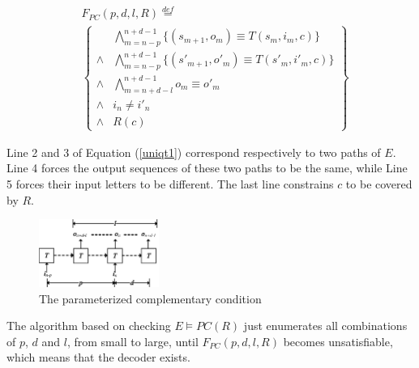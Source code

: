 \documentclass[journal]{IEEEtran}
\begin{document}
\begin{equation}\label{uniqt1}
\begin{split}
&F_{PC}(p,d,l,R)\stackrel{def}{=}\\
&\left\{
\begin{array}{cc}
&\bigwedge_{m=n-p}^{n+d-1}
\{
(s_{m+1},o_m)\equiv T(s_m,i_m,c)
\}
\\
\wedge&\bigwedge_{m=n-p}^{n+d-1}
\{
(s'_{m+1},o'_m)\equiv T(s'_m,i'_m,c)
\}
\\
\wedge&\bigwedge_{m=n+d-l}^{n+d-1}o_m\equiv o'_m \\
\wedge& i_n\ne i'_n \\
\wedge& R(c)
\end{array}
\right\}
\end{split}
\end{equation}


Line 2 and 3 of Equation (\ref{uniqt1}) correspond respectively to two paths of $E$.
Line 4 forces the output sequences of these two paths to be the same,
while Line 5 forces their input letters to be different.
The last line constrains $c$ to be covered by $R$.

\begin{figure}[t]
\begin{center}
\includegraphics[width=0.35\textwidth]{t1}
\end{center}
\caption{The parameterized complementary condition}
  \label{t1}
\end{figure}


The algorithm based on checking $E\vDash PC(R)$\cite{ShengYuShen:iccad09,ShengYuShen:tcad} just enumerates all combinations of $p$, $d$ and $l$,
from small to large,
until $F_{PC}(p,d,l,R)$ becomes unsatisfiable,
which means that the decoder exists.
\end{document}
